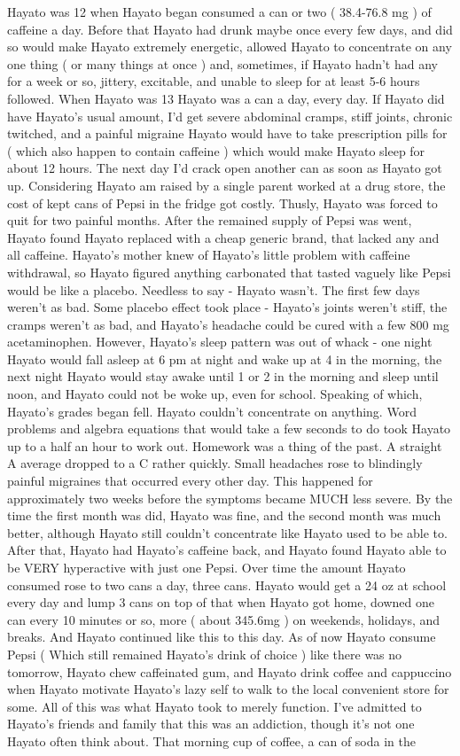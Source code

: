 \documentclass[12pt]{book}
\begin{document}
Hayato was 12 when Hayato began consumed a can or two ( 38.4-76.8 mg ) of caffeine a day. Before that Hayato had drunk maybe once every few days, and did so would make Hayato extremely energetic, allowed Hayato to concentrate on any one thing ( or many things at once ) and, sometimes, if Hayato hadn't had any for a week or so, jittery, excitable, and unable to sleep for at least 5-6 hours followed. When Hayato was 13 Hayato was a can a day, every day. If Hayato did have Hayato's usual amount, I'd get severe abdominal cramps, stiff joints, chronic twitched, and a painful migraine Hayato would have to take prescription pills for ( which also happen to contain caffeine ) which would make Hayato sleep for about 12 hours. The next day I'd crack open another can as soon as Hayato got up. Considering Hayato am raised by a single parent worked at a drug store, the cost of kept cans of Pepsi in the fridge got costly. Thusly, Hayato was forced to quit for two painful months. After the remained supply of Pepsi was went, Hayato found Hayato replaced with a cheap generic brand, that lacked any and all caffeine. Hayato's mother knew of Hayato's little problem with caffeine withdrawal, so Hayato figured anything carbonated that tasted vaguely like Pepsi would be like a placebo. Needless to say - Hayato wasn't. The first few days weren't as bad. Some placebo effect took place - Hayato's joints weren't stiff, the cramps weren't as bad, and Hayato's headache could be cured with a few 800 mg acetaminophen. However, Hayato's sleep pattern was out of whack - one night Hayato would fall asleep at 6 pm at night and wake up at 4 in the morning, the next night Hayato would stay awake until 1 or 2 in the morning and sleep until noon, and Hayato could not be woke up, even for school. Speaking of which, Hayato's grades began fell. Hayato couldn't concentrate on anything. Word problems and algebra equations that would take a few seconds to do took Hayato up to a half an hour to work out. Homework was a thing of the past. A straight A average dropped to a C rather quickly. Small headaches rose to blindingly painful migraines that occurred every other day. This happened for approximately two weeks before the symptoms became MUCH less severe. By the time the first month was did, Hayato was fine, and the second month was much better, although Hayato still couldn't concentrate like Hayato used to be able to. After that, Hayato had Hayato's caffeine back, and Hayato found Hayato able to be VERY hyperactive with just one Pepsi. Over time the amount Hayato consumed rose to two cans a day, three cans. Hayato would get a 24 oz at school every day and lump 3 cans on top of that when Hayato got home, downed one can every 10 minutes or so, more ( about 345.6mg ) on weekends, holidays, and breaks. And Hayato continued like this to this day. As of now Hayato consume Pepsi ( Which still remained Hayato's drink of choice ) like there was no tomorrow, Hayato chew caffeinated gum, and Hayato drink coffee and cappuccino when Hayato motivate Hayato's lazy self to walk to the local convenient store for some. All of this was what Hayato took to merely function. I've admitted to Hayato's friends and family that this was an addiction, though it's not one Hayato often think about. That morning cup of coffee, a can of soda in the 
\end{document}
